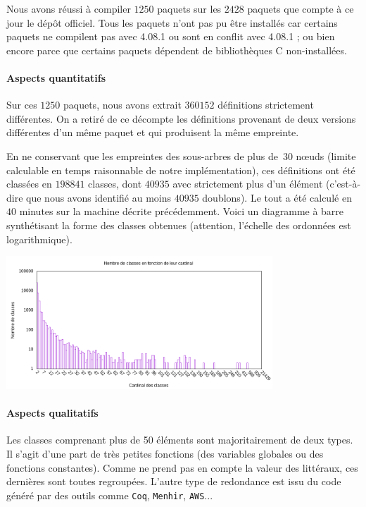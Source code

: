 Nous avons réussi à compiler $1250$ paquets sur les $2428$ paquets que
compte à ce jour le dépôt {\Opam} officiel. Tous les paquets n'ont pas
pu être installés car
certains paquets ne compilent pas avec {\OCaml} 4.08.1 ou
sont en conflit avec {\OCaml} 4.08.1 ; ou bien encore parce que
certains paquets dépendent de bibliothèques C non-installées.

\paragraph{Aspects quantitatifs}

Sur ces $1250$ paquets, nous avons extrait $360152$ définitions
strictement différentes. On a retiré de ce décompte les définitions
provenant de deux versions différentes d'un même paquet et qui
produisent la même empreinte.

En ne conservant que les empreintes des sous-arbres de plus de~$30$
nœuds (limite calculable en temps raisonnable de notre
implémentation), ces définitions ont été classées en $198841$ classes,
dont $40935$ avec strictement plus d'un élément (c'est-à-dire que nous
avons identifié au moins $40935$ doublons). Le tout a été calculé en
$40$ minutes sur la machine décrite précédemment. Voici un diagramme à
barre synthétisant la forme des classes obtenues (attention,
l'échelle des ordonnées est logarithmique).

\begin{center}
\includegraphics[width=10cm]{figures/bars.png}
\end{center}

\paragraph{Aspects qualitatifs}

Les classes comprenant plus de 50 éléments sont majoritairement de
deux types. Il s'agit d'une part de très petites fonctions (des
variables globales ou des fonctions constantes). Comme {\Asak} ne
prend pas en compte la valeur des littéraux, ces dernières sont toutes
regroupées. L'autre type de redondance est issu du code généré par des
outils comme \verb|Coq|, \verb|Menhir|, \verb|AWS|...


